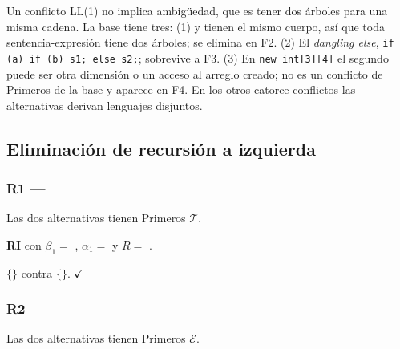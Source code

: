 \documentclass[12pt,a4paper]{article}
\newcommand{\cT}{\ensuremath{\mathcal{T}}}
\newcommand{\cE}{\ensuremath{\mathcal{E}}}
\newcommand{\cj}[1]{\ensuremath{\{}#1\ensuremath{\}}}
\newcommand{\tec}[1]{\textsf{\bfseries #1}}
\newcommand{\ok}{\ensuremath{\checkmark}}
\begin{document}
 Un conflicto LL(1) no implica ambigüedad, que es tener dos árboles para una
misma cadena. La base tiene tres: (1)  y  tienen el mismo cuerpo, así que
toda sentencia-expresión tiene dos árboles; se elimina en F2. (2) El \emph{dangling else},
\texttt{if (a) if (b) s1; else s2;}; sobrevive a F3. (3) En \texttt{new int[3][4]} el segundo
\tl{[} puede ser otra dimensión o un acceso al arreglo creado; no es un conflicto de Primeros de la
base y aparece en F4. En los otros catorce conflictos las alternativas derivan lenguajes disjuntos.

\subsection{Eliminación de recursión a izquierda}

\subsubsection*{R1 --- }

\begin{producciones}
\end{producciones}
 Las dos alternativas tienen Primeros \cT.

 \tec{RI} con $\beta_1 =$ , $\alpha_1 =$ \tl{,}  y
$R =$ .

\begin{producciones}
\end{producciones}
\cj{\tl{,}} contra \cj{\eps}. \ok

\subsubsection*{R2 --- }

\begin{producciones}
\end{producciones}
 Las dos alternativas tienen Primeros \cE.
\end{document}
